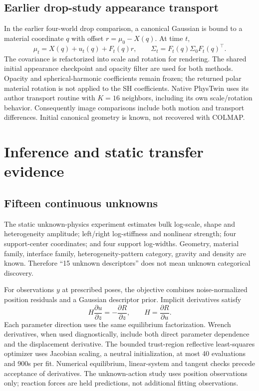 \documentclass[10pt,twocolumn,letterpaper]{article}
\begin{document}
\subsection{Earlier drop-study appearance transport}
In the earlier four-world drop comparison, a canonical Gaussian is bound to a material coordinate $q$ with offset $r=\mu_0-X(q)$. At time $t$,
\begin{equation}
 \mu_t=X(q)+u_t(q)+F_t(q)r,\qquad \Sigma_t=F_t(q)\Sigma_0F_t(q)^\top.
\end{equation}
The covariance is refactorized into scale and rotation for rendering. The shared initial appearance checkpoint and opacity filter are used for both methods. Opacity and spherical-harmonic coefficients remain frozen; the returned polar material rotation is not applied to the SH coefficients. Native PhysTwin uses its author transport routine with $K=16$ neighbors, including its own scale/rotation behavior. Consequently image comparisons include both motion and transport differences. Initial canonical geometry is known, not recovered with COLMAP.

\section{Inference and static transfer evidence}
\subsection{Fifteen continuous unknowns}
The static unknown-physics experiment estimates bulk log-scale, shape and heterogeneity amplitude; left/right log-stiffness and nonlinear strength; four support-center coordinates; and four support log-widths. Geometry, material family, interface family, heterogeneity-pattern category, gravity and density are known. Therefore ``15 unknown descriptors'' does not mean unknown categorical discovery.

For observations $y$ at prescribed poses, the objective combines noise-normalized position residuals and a Gaussian descriptor prior. Implicit derivatives satisfy
\begin{equation}
 H\frac{\partial u}{\partial z}=-\frac{\partial R}{\partial z},\qquad H=\frac{\partial R}{\partial u}.
\end{equation}
Each parameter direction uses the same equilibrium factorization. Wrench derivatives, when used diagnostically, include both direct parameter dependence and the displacement derivative. The bounded trust-region reflective least-squares optimizer uses Jacobian scaling, a neutral initialization, at most 40 evaluations and 900s per fit. Numerical equilibrium, linear-system and tangent checks precede acceptance of derivatives. The unknown-action study uses position observations only; reaction forces are held predictions, not additional fitting observations.
\end{document}
